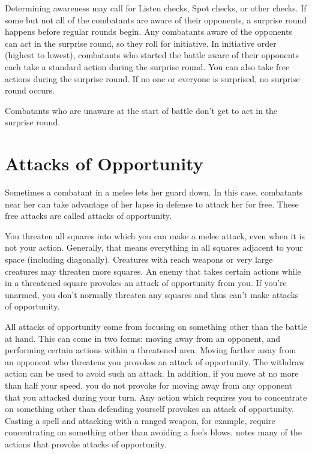 Determining awareness may call for Listen checks, Spot checks, or other checks.
 If some but not all of the combatants are aware of their opponents, a surprise round happens before regular rounds begin. Any combatants aware of the opponents can act in the surprise round, so they roll for initiative. In initiative order (highest to lowest), combatants who started the battle aware of their opponents each take a standard action during the surprise round. You can also take free actions during the surprise round. If no one or everyone is surprised, no surprise round occurs.

 Combatants who are unaware at the start of battle don't get to act in the surprise round.

\section{Attacks of Opportunity}
Sometimes a combatant in a melee lets her guard down. In this case, combatants near her can take advantage of her lapse in defense to attack her for free. These free attacks are called attacks of opportunity.

 You threaten all squares into which you can make a melee attack, even when it is not your action. Generally, that means everything in all squares adjacent to your space (including diagonally). Creatures with reach weapons or very large creatures may threaten more squares. An enemy that takes certain actions while in a threatened square provokes an attack of opportunity from you. If you're unarmed, you don't normally threaten any squares and thus can't make attacks of opportunity.

 All attacks of opportunity come from focusing on something other than the battle at hand. This can come in two forms: moving away from an opponent, and performing certain actions within a threatened area.
 Moving farther away from an opponent who threatens you provokes an attack of opportunity. The withdraw action can be used to avoid such an attack. In addition, if you move at no more than half your speed, you do not provoke for moving away from any opponent that you attacked during your turn.
 Any action which requires you to concentrate on something other than defending yourself provokes an attack of opportunity. Casting a spell and attacking with a ranged weapon, for example, require concentrating on something other than avoiding a foe's blows.  notes many of the actions that provoke attacks of opportunity.


